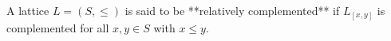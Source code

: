 A lattice $L = (S, \leq)$ is said to be **relatively complemented** if $L_{[x,y]}$ is complemented for all $x, y \in S$ with $x \leq y$.
